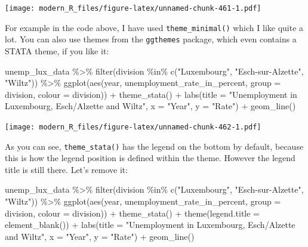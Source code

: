 \documentclass[
]{article}
\newenvironment{Shaded}{\begin{snugshade}}{\end{snugshade}}
\newcommand{\AttributeTok}[1]{\textcolor[rgb]{0.77,0.63,0.00}{#1}}
\newcommand{\FunctionTok}[1]{\textcolor[rgb]{0.00,0.00,0.00}{#1}}
\newcommand{\NormalTok}[1]{#1}
\newcommand{\SpecialCharTok}[1]{\textcolor[rgb]{0.00,0.00,0.00}{#1}}
\newcommand{\StringTok}[1]{\textcolor[rgb]{0.31,0.60,0.02}{#1}}
\begin{document}
\texttt{[image: modern\_R\_files/figure-latex/unnamed-chunk-461-1.pdf]}

For example in the code above, I have used \texttt{theme\_minimal()} which I like quite a lot. You can also
use themes from the \texttt{ggthemes} package, which even contains a STATA theme, if you like it:

\begin{Shaded}
\begin{Highlighting}[]
\NormalTok{unemp\_lux\_data }\SpecialCharTok{\%\textgreater{}\%}
  \FunctionTok{filter}\NormalTok{(division }\SpecialCharTok{\%in\%} \FunctionTok{c}\NormalTok{(}\StringTok{"Luxembourg"}\NormalTok{, }\StringTok{"Esch{-}sur{-}Alzette"}\NormalTok{, }\StringTok{"Wiltz"}\NormalTok{)) }\SpecialCharTok{\%\textgreater{}\%}
  \FunctionTok{ggplot}\NormalTok{(}\FunctionTok{aes}\NormalTok{(year, unemployment\_rate\_in\_percent, }\AttributeTok{group =}\NormalTok{ division, }\AttributeTok{colour =}\NormalTok{ division)) }\SpecialCharTok{+}
  \FunctionTok{theme\_stata}\NormalTok{() }\SpecialCharTok{+}
  \FunctionTok{labs}\NormalTok{(}\AttributeTok{title =} \StringTok{"Unemployment in Luxembourg, Esch/Alzette and Wiltz"}\NormalTok{, }\AttributeTok{x =} \StringTok{"Year"}\NormalTok{, }\AttributeTok{y =} \StringTok{"Rate"}\NormalTok{) }\SpecialCharTok{+}
  \FunctionTok{geom\_line}\NormalTok{()}
\end{Highlighting}
\end{Shaded}

\texttt{[image: modern\_R\_files/figure-latex/unnamed-chunk-462-1.pdf]}

As you can see, \texttt{theme\_stata()} has the legend on the bottom by default, because this is how the
legend position is defined within the theme. However the legend title is still there. Let's remove
it:

\begin{Shaded}
\begin{Highlighting}[]
\NormalTok{unemp\_lux\_data }\SpecialCharTok{\%\textgreater{}\%}
  \FunctionTok{filter}\NormalTok{(division }\SpecialCharTok{\%in\%} \FunctionTok{c}\NormalTok{(}\StringTok{"Luxembourg"}\NormalTok{, }\StringTok{"Esch{-}sur{-}Alzette"}\NormalTok{, }\StringTok{"Wiltz"}\NormalTok{)) }\SpecialCharTok{\%\textgreater{}\%}
  \FunctionTok{ggplot}\NormalTok{(}\FunctionTok{aes}\NormalTok{(year, unemployment\_rate\_in\_percent, }\AttributeTok{group =}\NormalTok{ division, }\AttributeTok{colour =}\NormalTok{ division)) }\SpecialCharTok{+}
  \FunctionTok{theme\_stata}\NormalTok{() }\SpecialCharTok{+}
  \FunctionTok{theme}\NormalTok{(}\AttributeTok{legend.title =} \FunctionTok{element\_blank}\NormalTok{()) }\SpecialCharTok{+}
  \FunctionTok{labs}\NormalTok{(}\AttributeTok{title =} \StringTok{"Unemployment in Luxembourg, Esch/Alzette and Wiltz"}\NormalTok{, }\AttributeTok{x =} \StringTok{"Year"}\NormalTok{, }\AttributeTok{y =} \StringTok{"Rate"}\NormalTok{) }\SpecialCharTok{+}
  \FunctionTok{geom\_line}\NormalTok{()}
\end{Highlighting}
\end{Shaded}
\end{document}
